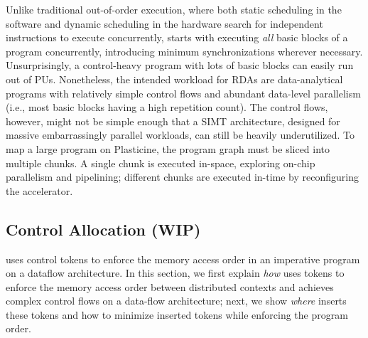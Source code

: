 Unlike traditional out-of-order execution, where both static scheduling in the software and dynamic
scheduling in the hardware search for independent instructions to execute concurrently, 
\name starts with executing \emph{all} basic blocks of a program concurrently,
introducing minimum synchronizations wherever necessary.
Unsurprisingly, a control-heavy program with lots of basic blocks can easily run out of PUs.
Nonetheless, the intended workload for RDAs are data-analytical programs with relatively simple
control flows and abundant data-level parallelism (i.e., most basic blocks having a high repetition
count).
The control flows, however, might not be simple enough that a SIMT architecture, designed for
massive embarrassingly parallel workloads, can still be heavily underutilized.
To map a large program on Plasticine, the program graph must be sliced into multiple chunks.
A single chunk is executed in-space, exploring on-chip parallelism and pipelining;
different chunks are executed in-time by reconfiguring the accelerator.

\subsection{Control Allocation (WIP)} \label{sec:controlalloc}
\label{sec:sync}
\name uses control tokens to enforce the memory access order in an imperative program on a dataflow
architecture. 
In this section, we first explain \emph{how} \name uses tokens to enforce the memory access 
order between distributed contexts and achieves complex control flows on a data-flow architecture;
next, we show \emph{where} \name inserts these tokens and how to minimize inserted tokens while
enforcing the program order.


